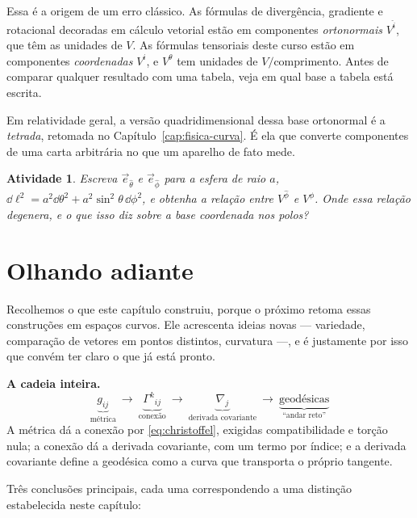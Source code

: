 \documentclass[12pt,a4paper,oneside]{book}
\theoremstyle{rgplain}
\newtheorem{activity}{Atividade}[chapter]
\theoremstyle{rgremark}
\begin{document}
\begin{atencao}
Essa é a origem de um erro clássico. As fórmulas de divergência, gradiente e
rotacional decoradas em cálculo vetorial estão em componentes
\emph{ortonormais} $V^{\hat i}$, que têm as unidades de $V$. As fórmulas
tensoriais deste curso estão em componentes \emph{coordenadas} $V^i$, e
$V^\theta$ tem unidades de $V/\text{comprimento}$. Antes de comparar qualquer
resultado com uma tabela, veja em qual base a tabela está escrita.
\end{atencao}

Em relatividade geral, a versão quadridimensional dessa base ortonormal é a
\emph{tetrada}, retomada no Capítulo~\ref{cap:fisica-curva}. É ela que
converte componentes de uma carta arbitrária no que um aparelho de fato mede.

\begin{activity}
Escreva $\vec e_{\hat\theta}$ e $\vec e_{\hat\phi}$ para a esfera de raio $a$,
$\dd\ell^2=a^2\dd\theta^2+a^2\sin^2\theta\,\dd\phi^2$, e obtenha a relação
entre $V^{\hat\phi}$ e $V^\phi$. Onde essa relação degenera, e o que isso diz
sobre a base coordenada nos polos?
\end{activity}

\section{Olhando adiante}
\label{sec:olhando-adiante}

Recolhemos o que este capítulo construiu, porque o próximo retoma essas
construções em espaços curvos. Ele acrescenta ideias novas --- variedade,
comparação de vetores em pontos distintos, curvatura ---, e é justamente por
isso que convém ter claro o que já está pronto.

\begin{resultado}
\textbf{A cadeia inteira.}
\[
  \underbrace{g_{ij}}_{\text{métrica}}
  \ \longrightarrow\
  \underbrace{\Gamma^k{}_{ij}}_{\text{conexão}}
  \ \longrightarrow\
  \underbrace{\nabla_j}_{\text{derivada covariante}}
  \ \longrightarrow\
  \underbrace{\text{geodésicas}}_{\text{``andar reto''}}
\]
A métrica dá a conexão por \eqref{eq:christoffel}, exigidas compatibilidade e
torção nula; a conexão dá a derivada covariante, com um termo por índice; e a
derivada covariante define a geodésica como a curva que transporta o próprio
tangente.
\end{resultado}

Três conclusões principais, cada uma correspondendo a uma distinção
estabelecida neste capítulo:
\end{document}
